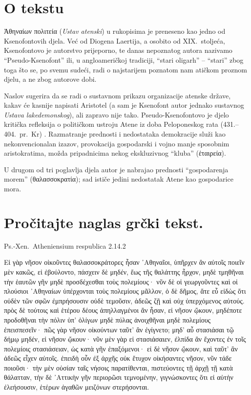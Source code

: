 


\section*{O tekstu}
Ἀθηναίων πολιτεία (\textit{Ustav atenski}) u rukopisima je preneseno kao jedno od Ksenofontovih djela. Već od Diogena Laertija, a osobito od XIX.~stoljeća, Ksenofontovo je autorstvo prijeporno, te danas nepoznatog autora nazivamo ``Pseudo-Ksenofont'' ili, u angloameričkoj tradiciji, ``stari oligarh'' – ``stari'' zbog toga što se, po svemu sudeći, radi o najstarijem poznatom nam atičkom proznom djelu, a ne zbog autorove dobi.

Naslov sugerira da se radi o sustavnom prikazu organizacije atenske države, kakav će kasnije napisati Aristotel (a sam je Ksenofont autor jednako sustavnog \textit{Ustava lakedemonskog}), ali zapravo nije tako. Pseudo-Ksenofontovo je djelo kritička refleksija o političkom ustroju Atene iz doba Peloponeskog rata  (431.–404.\ pr.~Kr) . Razmatranje prednosti i nedostataka demokracije služi kao nekonvencionalan izazov, provokacija gospodarski i vojno manje sposobnim aristokratima, možda pripadnicima nekog ekskluzivnog ``kluba'' \textgreek[variant=ancient]{(ἑταιρεία).}

U drugom od tri poglavlja djela autor je nabrajao prednosti ``gospodarenja morem'' \textgreek[variant=ancient]{(θαλασσοκρατία);} sad ističe jedini nedostatak Atene kao gospodarice mora.


\newpage

\section*{Pročitajte naglas grčki tekst.}
Ps.-Xen.\ Atheniensium respublica 2.14.2

\medskip

{\large
\begin{greek}
\noindent Eἰ γὰρ νῆσον οἰκοῦντες θαλασσοκράτορες ἦσαν ᾿Αθηναῖοι, ὑπῆρχεν ἂν αὐτοῖς ποιεῖν μὲν κακῶς, εἰ ἐβούλοντο, πάσχειν δὲ μηδέν, ἕως τῆς θαλάττης ἦρχον, μηδὲ τμηθῆναι τὴν ἑαυτῶν γῆν μηδὲ προσδέχεσθαι τοὺς πολεμίους· νῦν δὲ οἱ γεωργοῦντες καὶ οἱ πλούσιοι ᾿Αθηναίων ὑπέρχονται τοὺς πολεμίους μᾶλλον, ὁ δὲ δῆμος, ἅτε εὖ εἰδὼς ὅτι οὐδὲν τῶν σφῶν ἐμπρήσουσιν οὐδὲ τεμοῦσιν, ἀδεῶς ζῇ καὶ οὐχ ὑπερχόμενος αὐτούς. πρὸς δὲ τούτοις καὶ ἑτέρου δέους ἀπηλλαγμένοι ἂν ἦσαν, εἰ νῆσον ᾤκουν, μηδέποτε προδοθῆναι τὴν πόλιν ὑπ' ὀλίγων μηδὲ πύλας ἀνοιχθῆναι μηδὲ πολεμίους ἐπεισπεσεῖν· πῶς γὰρ νῆσον οἰκούντων ταῦτ' ἂν ἐγίγνετο; μηδ' αὖ στασιάσαι τῷ δήμῳ μηδέν, εἰ νῆσον ᾤκουν· νῦν μὲν γὰρ εἰ στασιάσαιεν, ἐλπίδα ἂν ἔχοντες ἐν τοῖς πολεμίοις στασιάσειαν, ὡς κατὰ γῆν ἐπαξόμενοι· εἰ δὲ νῆσον ᾤκουν, καὶ ταῦτ' ἂν ἀδεῶς εἶχεν αὐτοῖς. ἐπειδὴ οὖν ἐξ ἀρχῆς οὐκ ἔτυχον οἰκήσαντες νῆσον, νῦν τάδε ποιοῦσι· τὴν μὲν οὐσίαν ταῖς νήσοις παρατίθενται, πιστεύοντες τῇ ἀρχῇ τῇ κατὰ θάλατταν, τὴν δὲ ᾿Αττικὴν γῆν περιορῶσι τεμνομένην, γιγνώσκοντες ὅτι εἰ αὐτὴν ἐλεήσουσιν, ἑτέρων ἀγαθῶν μειζόνων στερήσονται.

\end{greek}
}
